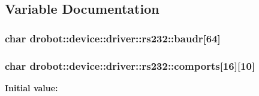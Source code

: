 \subsection{Variable Documentation}
\hypertarget{namespacedrobot_1_1device_1_1driver_1_1rs232_adb16b37b69d9693efd2c3d3448a1748a}{
\subsubsection[{baudr}]{\setlength{\rightskip}{0pt plus 5cm}char drobot\-::device\-::driver\-::rs232\-::baudr\mbox{[}64\mbox{]}}}\label{namespacedrobot_1_1device_1_1driver_1_1rs232_adb16b37b69d9693efd2c3d3448a1748a}
\hypertarget{namespacedrobot_1_1device_1_1driver_1_1rs232_a30d4fee63b29a5e10a356e5eaabca0c2}{
\subsubsection[{comports}]{\setlength{\rightskip}{0pt plus 5cm}char drobot\-::device\-::driver\-::rs232\-::comports\mbox{[}16\mbox{]}\mbox{[}10\mbox{]}}}\label{namespacedrobot_1_1device_1_1driver_1_1rs232_a30d4fee63b29a5e10a356e5eaabca0c2}
{\bfseries Initial value\-:}
